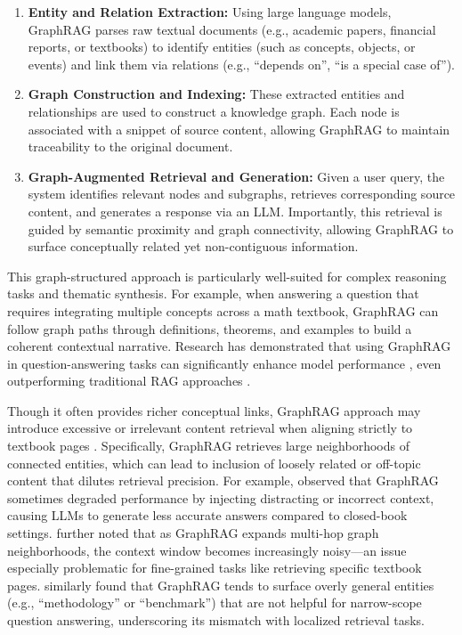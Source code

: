 \documentclass[runningheads]{llncs}
\begin{document}
\begin{enumerate}
    \item \textbf{Entity and Relation Extraction:} Using large language models, GraphRAG parses raw textual documents (e.g., academic papers, financial reports, or textbooks) to identify entities (such as concepts, objects, or events) and link them via relations (e.g., ``depends on'', ``is a special case of'').
    
    \item \textbf{Graph Construction and Indexing:} These extracted entities and relationships are used to construct a knowledge graph. Each node is associated with a snippet of source content, allowing GraphRAG to maintain traceability to the original document.

    \item \textbf{Graph-Augmented Retrieval and Generation:} Given a user query, the system identifies relevant nodes and subgraphs, retrieves corresponding source content, and generates a response via an LLM. Importantly, this retrieval is guided by semantic proximity and graph connectivity, allowing GraphRAG to surface conceptually related yet non-contiguous information.
\end{enumerate}

This graph-structured approach is particularly well-suited for complex reasoning tasks and thematic synthesis. For example, when answering a question that requires integrating multiple concepts across a math textbook, GraphRAG can follow graph paths through definitions, theorems, and examples to build a coherent contextual narrative. Research has demonstrated that using GraphRAG in question-answering tasks can significantly enhance model performance \cite{he2024g}, even outperforming traditional RAG approaches \cite{lin2024research}.

Though it often provides richer conceptual links, GraphRAG approach may introduce excessive or irrelevant content retrieval when aligning strictly to textbook pages \cite{guo2024graphrag,zhang2025survey,he2024g}. Specifically, GraphRAG retrieves large neighborhoods of connected entities, which can lead to inclusion of loosely related or off-topic content that dilutes retrieval precision. For example, \cite{guo2024graphrag} observed that GraphRAG sometimes degraded performance by injecting distracting or incorrect context, causing LLMs to generate less accurate answers compared to closed-book settings. \cite{zhang2025survey} further noted that as GraphRAG expands multi-hop graph neighborhoods, the context window becomes increasingly noisy—an issue especially problematic for fine-grained tasks like retrieving specific textbook pages. \cite{he2024g} similarly found that GraphRAG tends to surface overly general entities (e.g., “methodology” or “benchmark”) that are not helpful for narrow-scope question answering, underscoring its mismatch with localized retrieval tasks.
\end{document}
